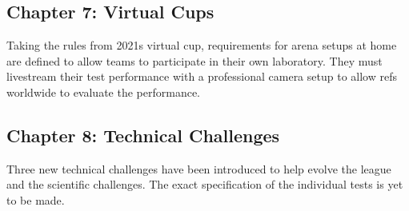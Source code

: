 \subsection{Chapter 7: Virtual Cups}

Taking the rules from 2021s virtual cup, 
requirements for arena setups at home are defined to allow teams to participate in their own laboratory.
They must livestream their test performance with a professional camera setup to allow refs worldwide to evaluate the performance.

\subsection{Chapter 8: Technical Challenges}

Three new technical challenges have been introduced to help evolve the league and the scientific challenges. 
The exact specification of the individual tests is yet to be made.
	

